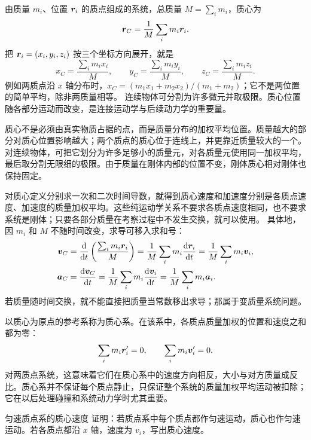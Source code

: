{由质量 $m_i$、位置 $\bm{r}_i$ 的质点组成的系统，总质量 $M=\sum_i m_i$，质心为
\begin{equation}
\bm{r}_C=\frac1M\sum_i m_i\bm{r}_i.
\end{equation}
把 $\bm{r}_i=(x_i,y_i,z_i)$ 按三个坐标方向展开，就是
\begin{equation}
x_C=\frac{\sum_i m_ix_i}{M},\qquad
y_C=\frac{\sum_i m_iy_i}{M},\qquad
z_C=\frac{\sum_i m_iz_i}{M}.
\end{equation}
例如两质点沿 $x$ 轴分布时，$x_C=(m_1x_1+m_2x_2)/(m_1+m_2)$；它不是两位置的简单平均，除非两质量相等。
连续物体可分割为许多微元并取极限。质心位置随各部分运动而改变，是连接运动学与后续动力学的重要量。

质心不是必须由真实物质占据的点，而是质量分布的加权平均位置。质量越大的部分对质心位置影响越大；两个质点的质心位于连线上，并更靠近质量较大的一个。对连续物体，可把它划分为许多足够小的质量元，对各质量元使用同一加权平均，最后取分割无限细的极限。由于质量在刚体内部的位置不变，刚体质心相对刚体也保持固定。

对质心定义分别求一次和二次时间导数，就得到质心速度和加速度分别是各质点速度、加速度的质量加权平均。这些纯运动学关系不要求各质点速度相同，也不要求系统是刚体；只要各部分质量在考察过程中不发生交换，就可以使用。
具体地，因 $m_i$ 和 $M$ 不随时间改变，求导可移入求和号：
\begin{align}
\vect v_C&=\frac{\dd}{\dd t}\left(\frac{\sum_i m_i\vect r_i}{M}\right)
=\frac1M\sum_i m_i\frac{\dd\vect r_i}{\dd t}
=\frac1M\sum_i m_i\vect v_i,\\
\vect a_C&=\frac{\dd\vect v_C}{\dd t}
=\frac1M\sum_i m_i\frac{\dd\vect v_i}{\dd t}
=\frac1M\sum_i m_i\vect a_i.
\end{align}
若质量随时间交换，就不能直接把质量当常数移出求导；那属于变质量系统问题。

以质心为原点的参考系称为质心系。在该系中，各质点质量加权的位置和速度之和都为零：
\begin{equation}
 \sum_i m_i\bm{r}_i'=0,\qquad
 \sum_i m_i\bm{v}_i'=0.
\end{equation}
对两质点系统，这意味着它们在质心系中的速度方向相反，大小与对方质量成反比。质心系并不保证每个质点静止，只保证整个系统的质量加权平均运动被扣除；它在以后处理碰撞和系统动力学时尤其重要。

\begin{origexamplebox}{匀速质点系的质心速度}\label{ch04:ex:k07-2-78}
证明：若质点系中每个质点都作匀速运动，质心也作匀速运动。若各质点都沿 $x$ 轴，速度为 $v_i$，写出质心速度。


\end{origexamplebox}}
